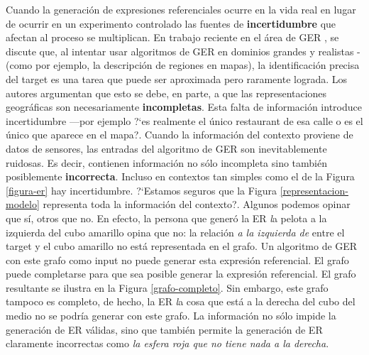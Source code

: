 Cuando la generaci\'on de expresiones referenciales ocurre en la vida real
en lugar de ocurrir en un experimento controlado las fuentes de \textbf{incertidumbre} que afectan al proceso se multiplican. En trabajo 
reciente en el \'area de GER \cite{turner2008} , \cite{turner2009} se discute que, al intentar usar algoritmos de GER en dominios grandes 
y realistas -(como por ejemplo, la descripci\'on de regiones en mapas), la identificaci\'on precisa del target es una tarea que puede ser 
aproximada pero raramente lograda. Los autores argumentan que esto se debe, en parte, a que las representaciones geogr\'aficas 
son necesariamente \textbf{incompletas}. Esta falta de informaci\'on introduce incertidumbre ---por ejemplo ?`es realmente el \'unico restaurant 
de esa calle o es el \'unico que aparece en el mapa?.
Cuando la informaci\'on del contexto proviene de datos de sensores, las entradas del algoritmo de GER son inevitablemente ruidosas. Es decir, 
contienen informaci\'on no s\'olo incompleta sino tambi\'en posiblemente {\bf incorrecta}. Incluso en contextos tan simples como el de la 
Figura \ref{figura-er} hay incertidumbre. ?`Estamos seguros que la Figura \ref{representacion-modelo} representa toda la informaci\'on del 
contexto?. Algunos podemos opinar que s\'i, otros que no. En efecto, la persona que gener\'o la ER {\emph la pelota a la izquierda del cubo 
amarillo} opina que no: la relaci\'on \emph{a la izquierda de} entre el target y el cubo amarillo no est\'a representada en el grafo. Un 
algoritmo de GER con este grafo como input no puede generar esta expresi\'on referencial. El grafo puede completarse para que sea posible
generar la expresi\'on referencial. El grafo resultante se ilustra en la Figura \ref{grafo-completo}. Sin embargo, este grafo tampoco es completo, 
de hecho, la ER {\emph la cosa que est\'a a la derecha del cubo del medio} no se podr\'ia generar con este grafo. La informaci\'on no s\'olo 
impide la generaci\'on de ER v\'alidas, sino que tambi\'en permite la generaci\'on de ER claramente incorrectas como \emph{la esfera roja 
que no tiene nada a la derecha}.

